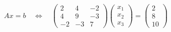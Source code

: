 \documentclass[preview]{standalone}
\begin{document}
\begin{align*}
A x = b \quad \Leftrightarrow \quad\begin{pmatrix}2 & 4 & -2\\ 4 & 9 & -3\\ -2 & -3 & 7\end{pmatrix}\begin{pmatrix}x_1\\x_2\\x_3\end{pmatrix}= \begin{pmatrix}2\\8\\10\end{pmatrix}
\end{align*}
\end{document}
